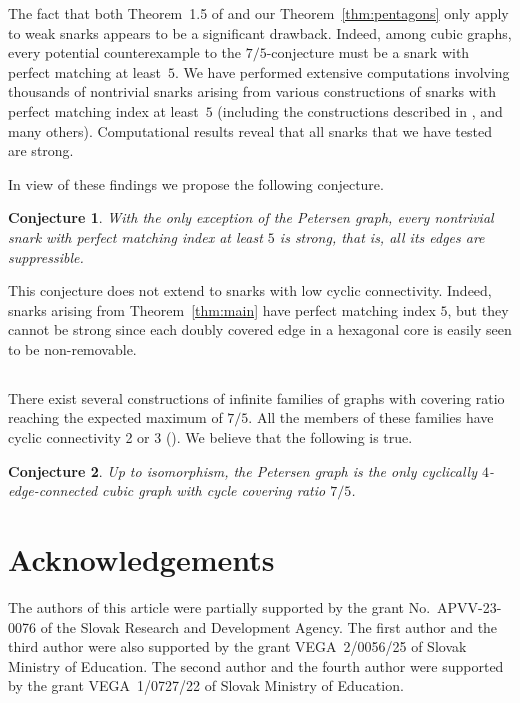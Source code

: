 \documentclass[a4paper]{amsart}
\theoremstyle{plain}
\newtheorem{conjecture}{Conjecture}
\theoremstyle{definition}
\begin{document}
The fact that both Theorem~1.5 of \cite{LHLZ} and our
Theorem~\ref{thm:pentagons} only apply to weak snarks appears
to be a significant drawback. Indeed, among cubic graphs, every
potential counterexample to the $7/5$-conjecture must be a
snark with perfect matching at least~$5$. We have performed
extensive computations involving thousands of nontrivial snarks
arising from various constructions of snarks with perfect
matching index at least~$5$ (including the constructions
described in \cite{MS_P1, MS_P2}, and many others).
Computational  results reveal that all snarks that we have
tested are strong.

In view of these findings we propose the following conjecture.

\begin{conjecture}
{\rm With the only exception of the Petersen graph, every
nontrivial snark with perfect matching index at least $5$ is
strong, that is, all its edges are suppressible.}
\end{conjecture}

This conjecture does not extend to snarks with low cyclic
connectivity. Indeed, snarks arising from
Theorem~\ref{thm:main} have perfect matching index $5$, but
they cannot be strong since each doubly covered edge in a
hexagonal core is easily seen to be non-removable.


\subsection{}
There exist several constructions of infinite families of
graphs with covering ratio reaching the expected maximum of
$7/5$. All the members of these families have cyclic
connectivity 2 or 3 (\cite{BJJ, MS_SCC}). We believe that the
following is true.

\begin{conjecture}
{\rm Up to isomorphism, the Petersen graph is the only
cyclically $4$-edge-connected cubic graph with cycle covering
ratio $7/5$.}
\end{conjecture}


\section*{Acknowledgements}
\noindent{}The authors of this article were partially supported
by the grant No.~APVV-23-0076 of the Slovak Research and
Development Agency. The first author and the third author were
also supported by the grant VEGA~2/0056/25 of Slovak Ministry
of Education. The second author and the fourth author were
supported by the grant VEGA~1/0727/22 of Slovak Ministry of
Education.
\end{document}
